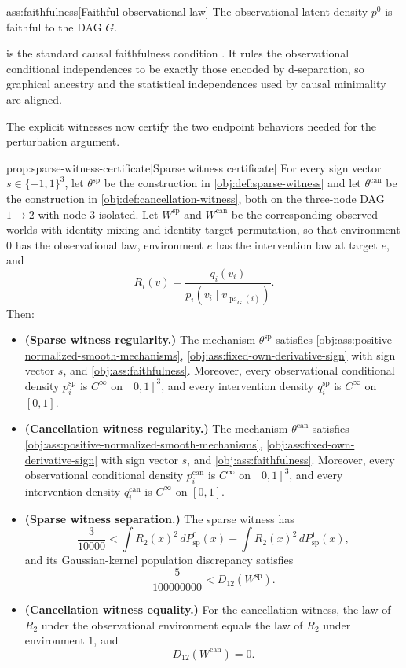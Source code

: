 \begin{assumptionv}{ass:faithfulness}[Faithful observational law]
The observational latent density \(p^0\) is faithful to the DAG \(G\).
\end{assumptionv}

 is the standard causal faithfulness condition \citep{SpirtesGlymourScheines2000}. It rules the observational conditional independences to be exactly those encoded by d-separation, so graphical ancestry and the statistical independences used by causal minimality are aligned.

The explicit witnesses now certify the two endpoint behaviors needed for the perturbation argument.

\begin{theoremv}{prop:sparse-witness-certificate}[Sparse witness certificate]
For every sign vector \(s\in\{-1,1\}^3\), let \(\theta^{\mathrm{sp}}\) be the construction in \cref{obj:def:sparse-witness} and let \(\theta^{\mathrm{can}}\) be the construction in \cref{obj:def:cancellation-witness}, both on the three-node DAG \(1\to2\) with node \(3\) isolated. Let \(W^{\mathrm{sp}}\) and \(W^{\mathrm{can}}\) be the corresponding observed worlds with identity mixing and identity target permutation, so that environment \(0\) has the observational law, environment \(e\) has the intervention law at target \(e\), and
\[
R_i(v)=\frac{q_i(v_i)}{p_i(v_i\mid v_{\operatorname{pa}_G(i)})}.
\]
Then:
\begin{itemize}
\item \textbf{(Sparse witness regularity.)} The mechanism \(\theta^{\mathrm{sp}}\) satisfies \cref{obj:ass:positive-normalized-smooth-mechanisms}, \cref{obj:ass:fixed-own-derivative-sign} with sign vector \(s\), and \cref{obj:ass:faithfulness}. Moreover, every observational conditional density \(p_i^{\mathrm{sp}}\) is \(C^\infty\) on \([0,1]^3\), and every intervention density \(q_i^{\mathrm{sp}}\) is \(C^\infty\) on \([0,1]\).
\item \textbf{(Cancellation witness regularity.)} The mechanism \(\theta^{\mathrm{can}}\) satisfies \cref{obj:ass:positive-normalized-smooth-mechanisms}, \cref{obj:ass:fixed-own-derivative-sign} with sign vector \(s\), and \cref{obj:ass:faithfulness}. Moreover, every observational conditional density \(p_i^{\mathrm{can}}\) is \(C^\infty\) on \([0,1]^3\), and every intervention density \(q_i^{\mathrm{can}}\) is \(C^\infty\) on \([0,1]\).
\item \textbf{(Sparse witness separation.)} The sparse witness has
\[
\frac{3}{10000}
<
\int R_2(x)^2\,dP^0_{\mathrm{sp}}(x)
-
\int R_2(x)^2\,dP^1_{\mathrm{sp}}(x),
\]
and its Gaussian-kernel population discrepancy satisfies
\[
\frac{5}{100000000}<D_{12}(W^{\mathrm{sp}}).
\]
\item \textbf{(Cancellation witness equality.)} For the cancellation witness, the law of \(R_2\) under the observational environment equals the law of \(R_2\) under environment \(1\), and
\[
D_{12}(W^{\mathrm{can}})=0.
\]
\end{itemize}
\end{theoremv}

